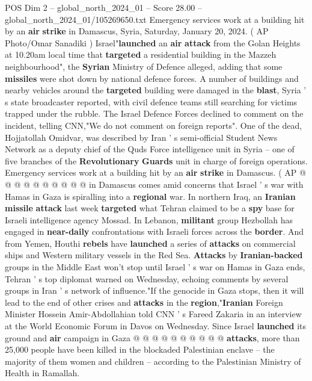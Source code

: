 \begin{textsample}{POS Dim 2 – global\_north\_2024\_01 – Score 28.00 – global\_north\_2024\_01/105269650.txt}  \label{ex:f2_pos_108}
Emergency services work at a building hit by an \textbf{air} \textbf{strike} in Damascus, Syria, Saturday, January 20, 2024. ( AP Photo/Omar Sanadiki ) Israel"\textbf{launched} an \textbf{air} \textbf{attack} from the Golan Heights at 10.20am local time that \textbf{targeted} a residential building in the Mazzeh neighbourhood", the \textbf{Syrian} Ministry of Defence alleged, adding that some \textbf{missiles} were shot down by national defence forces.
A number of buildings and nearby vehicles around the \textbf{targeted} building were damaged in the \textbf{blast}, Syria ' s state broadcaster reported, with civil defence teams still searching for victims trapped under the rubble.
The Israel Defence Forces declined to comment on the incident, telling CNN,"We do not comment on foreign reports".
One of the dead, Hojjatollah Omidvar, was described by Iran ' s semi-official Student News Network as a deputy chief of the Quds Force intelligence unit in Syria -- one of five branches of the \textbf{Revolutionary} \textbf{Guards} unit in charge of foreign operations.
Emergency services work at a building hit by an \textbf{air} \textbf{strike} in Damascus. ( AP @ @ @ @ @ @ @ @ @ @ in Damascus comes amid concerns that Israel ' s war with Hamas in Gaza is spiralling into a \textbf{regional} war.
In northern Iraq, an \textbf{Iranian} \textbf{missile} \textbf{attack} last week \textbf{targeted} what Tehran claimed to be a \textbf{spy} base for Israeli intelligence agency Mossad.
In Lebanon, \textbf{militant} group Hezbollah has engaged in \textbf{near-daily} confrontations with Israeli forces across the \textbf{border}.
And from Yemen, Houthi \textbf{rebels} have \textbf{launched} a series of \textbf{attacks} on commercial ships and Western military vessels in the Red Sea. \textbf{Attacks} by \textbf{Iranian-backed} groups in the Middle East won't stop until Israel ' s war on Hamas in Gaza ends, Tehran ' s top diplomat warned on Wednesday, echoing comments by several groups in Iran ' s network of influence."If the genocide in Gaza stops, then it will lead to the end of other crises and \textbf{attacks} in the \textbf{region},"\textbf{Iranian} Foreign Minister Hossein Amir-Abdollahian told CNN ' s Fareed Zakaria in an interview at the World Economic Forum in Davos on Wednesday.
Since Israel \textbf{launched} its ground and \textbf{air} campaign in Gaza @ @ @ @ @ @ @ @ @ @ \textbf{attacks}, more than 25,000 people have been killed in the blockaded Palestinian enclave -- the majority of them women and children -- according to the Palestinian Ministry of Health in Ramallah.

\end{textsample}

